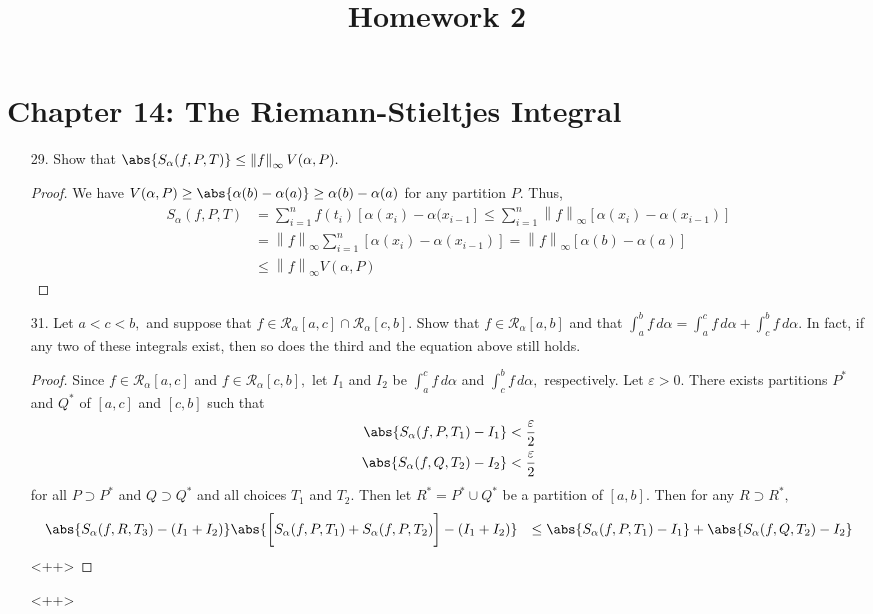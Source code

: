 \documentclass{article}
\begin{document}
\title{Homework 2}
\maketitle
\thispagestyle{fancy}

\section*{Chapter 14: The Riemann-Stieltjes Integral}

\begin{itemize}
	\item[29.] Show that $\abs{S_\alpha(f, P, T)}\le \left\lVert f \right\rVert_\infty V(\alpha, P).$
		\begin{proof}
			We have $V(\alpha, P)\ge \abs{\alpha(b)-\alpha(a)}\ge \alpha(b)-\alpha(a)$ for any partition $P.$ Thus,
			\begin{align*}
				S_\alpha(f, P, T) &= \sum_{i=1}^{n} f(t_i)\left[ \alpha(x_i)-\alpha(x_{i-1} \right] \le \sum_{i=1}^{n} \left\lVert f \right\rVert_\infty \left[ \alpha(x_i)-\alpha(x_{i-1})\right] \\
				&= \left\lVert f \right\rVert_\infty \sum_{i=1}^{n} \left[ \alpha(x_i)-\alpha(x_{i-1}) \right] = \left\lVert f \right\rVert_\infty \left[ \alpha(b)-\alpha(a) \right] \\
				&\le \left\lVert f \right\rVert_\infty V(\alpha, P)
			\end{align*}
		\end{proof}

	\item[31.] Let $a<c<b,$ and suppose that $f\in\mathcal R_\alpha[a, c]\cap \mathcal R_\alpha[c, b].$ Show that $f\in\mathcal R_\alpha[a, b]$ and that $\int_a^bf\, d\alpha=\int_a^c f\, d\alpha + \int_c^b f\, d\alpha.$ In fact, if any two of these integrals exist, then so does the third and the equation above still holds.
		\begin{proof}
			Since $f\in \mathcal R_\alpha[a, c]$ and $f\in\mathcal R_\alpha[c, b],$ let $I_1$ and $I_2$ be $\int_a^c f\, d\alpha$ and $\int_c^b f\, d\alpha,$ respectively. Let $\varepsilon>0.$ There exists partitions $P^*$ and $Q^*$ of $[a, c]$ and $[c, b]$ such that
			\begin{align*}
				\abs{S_\alpha(f, P, T_1)-I_1} &< \frac{\varepsilon}{2} \\
				\abs{S_\alpha(f, Q, T_2) - I_2} &< \frac{\varepsilon}{2}
			\end{align*}
			for all $P\supset P^*$ and $Q\supset Q^*$ and all choices $T_1$ and $T_2.$ Then let $R^*=P^*\cup Q^*$ be a partition of $[a, b].$ Then for any $R\supset R^*,$
			\begin{align*}
				\abs{S_\alpha(f, R, T_3) - (I_1+I_2)} &
				\abs{\bigg[S_\alpha(f, P, T_1)+S_\alpha(f, P, T_2)\bigg] - (I_1+I_2)} &\le \abs{S_\alpha(f, P, T_1)-I_1} + \abs{S_\alpha(f, Q, T_2) - I_2}
			\end{align*}<++>
		\end{proof}<++>


\end{itemize}
\end{document}
